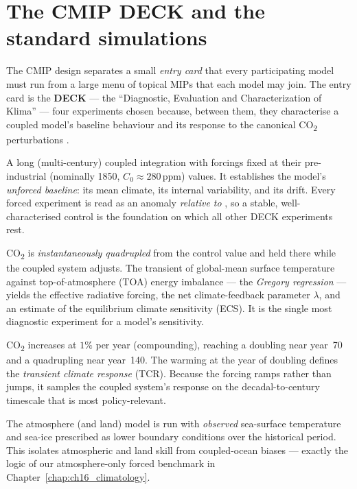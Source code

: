 \section{The CMIP DECK and the standard simulations}\label{sec:c20_deck}

The CMIP design separates a small \emph{entry card} that every participating model
must run from a large menu of topical MIPs that each model may join. The entry
card is the \textbf{DECK} --- the ``Diagnostic, Evaluation and Characterization of
Klima'' --- four experiments chosen because, between them, they characterise a
coupled model's baseline behaviour and its response to the canonical
CO\textsubscript{2} perturbations \citep{eyring2016cmip6}.

\begin{description}[leftmargin=1.5em,style=nextline]
\item[\code{piControl} --- pre-industrial control.]
  A long (multi-century) coupled integration with forcings fixed at their
  pre-industrial (nominally 1850, $C_0\approx 280\,$ppm) values. It establishes the
  model's \emph{unforced baseline}: its mean climate, its internal variability, and
  its drift. Every forced experiment is read as an anomaly \emph{relative to}
  , so a stable, well-characterised control is the foundation on
  which all other DECK experiments rest.
\item[\code{abrupt-4xCO2}.]
  CO\textsubscript{2} is \emph{instantaneously quadrupled} from the control value
  and held there while the coupled system adjusts. The transient of global-mean
  surface temperature against top-of-atmosphere (TOA) energy imbalance --- the
  \emph{Gregory regression} --- yields the effective radiative forcing, the net
  climate-feedback parameter $\lambda$, and an estimate of the equilibrium climate
  sensitivity (ECS). It is the single most diagnostic experiment for a model's
  sensitivity.
\item[\code{1pctCO2}.]
  CO\textsubscript{2} increases at $1\%$ per year (compounding), reaching a
  doubling near year~70 and a quadrupling near year~140. The warming at the year of
  doubling defines the \emph{transient climate response} (TCR). Because the forcing
  ramps rather than jumps, it samples the coupled system's response on the
  decadal-to-century timescale that is most policy-relevant.
\item[AMIP --- atmosphere-only.]
  The atmosphere (and land) model is run with \emph{observed} sea-surface
  temperature and sea-ice prescribed as lower boundary conditions over the
  historical period. This isolates atmospheric and land skill from coupled-ocean
  biases --- exactly the logic of our atmosphere-only forced benchmark in
  Chapter~\ref{chap:ch16_climatology}.
\end{description}


